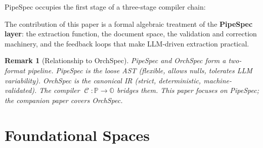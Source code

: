 \documentclass[11pt,a4paper]{article}
\newtheorem{remark}{Remark}[section]
\theoremstyle{definition}
\DeclareMathOperator{\ExtractLLM}{\mathcal{E}_{\bm\theta}}
\DeclareMathOperator{\Compile}{\mathcal{C}}
\newcommand{\nspace}{\mathbb{N}}
\newcommand{\pspace}{\mathbb{P}}
\newcommand{\ospace}{\mathbb{O}}
\newcommand{\tspacek}{\mathbb{T}_k}
\begin{document}
PipeSpec occupies the first stage of a three-stage compiler chain:

\begin{center}
\end{center}

The contribution of this paper is a formal algebraic treatment of the \textbf{PipeSpec layer}: the extraction function, the document space, the validation and correction machinery, and the feedback loops that make LLM-driven extraction practical.

\begin{remark}[Relationship to OrchSpec]
PipeSpec and OrchSpec form a two-format pipeline. PipeSpec is the \emph{loose AST} (flexible, allows nulls, tolerates LLM variability). OrchSpec is the \emph{canonical IR} (strict, deterministic, machine-validated). The compiler $\Compile : \pspace \to \ospace$ bridges them. This paper focuses on PipeSpec; the companion paper \cite{orchspec-formal} covers OrchSpec.
\end{remark}

\section{Foundational Spaces}
\end{document}
